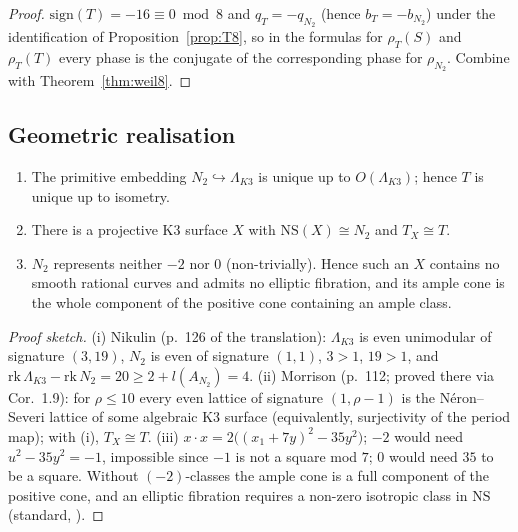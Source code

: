 \begin{proof}
$\mathrm{sign}(T)=-16\equiv0\bmod8$ and $q_T=-q_{N_2}$ (hence $b_T=-b_{N_2}$) under the identification of Proposition~\ref{prop:T8}, so in the formulas for $\rho_T(S)$ and $\rho_T(T)$ every phase is the conjugate of the corresponding phase for $\rho_{N_2}$. Combine with Theorem~\ref{thm:weil8}.
\end{proof}

\subsection{Geometric realisation}\label{sec:geom}
\begin{theorem}\label{thm:K3exist8}
\begin{enumerate}[label=(\roman*)]
\item The primitive embedding $N_2\hookrightarrow\Lambda_{K3}$ is unique up to $O(\Lambda_{K3})$; hence $T$ is unique up to isometry.
\item There is a projective K3 surface $X$ with $\mathrm{NS}(X)\cong N_2$ and $T_X\cong T$.
\item $N_2$ represents neither $-2$ nor $0$ (non-trivially). Hence such an $X$ contains no smooth rational curves and admits no elliptic fibration, and its ample cone is the whole component of the positive cone containing an ample class.
\end{enumerate}
\end{theorem}
\begin{proof}[Proof sketch]
(i) Nikulin \cite[Thm.~1.14.4]{Nikulin} (p.~126 of the translation): $\Lambda_{K3}$ is even unimodular of signature $(3,19)$, $N_2$ is even of signature $(1,1)$, $3>1$, $19>1$, and $\mathrm{rk}\,\Lambda_{K3}-\mathrm{rk}\,N_2=20\ge2+l(A_{N_2})=4$. (ii) Morrison \cite[Cor.~2.9(i)]{Morrison} (p.~112; proved there via Cor.~1.9): for $\rho\le10$ every even lattice of signature $(1,\rho-1)$ is the N\'eron--Severi lattice of some algebraic K3 surface (equivalently, surjectivity of the period map); with (i), $T_X\cong T$. (iii) $x\cdot x=2\big((x_1+7y)^2-35y^2\big)$; $-2$ would need $u^2-35y^2=-1$, impossible since $-1$ is not a square mod $7$; $0$ would need $35$ to be a square. Without $(-2)$-classes the ample cone is a full component of the positive cone, and an elliptic fibration requires a non-zero isotropic class in $\mathrm{NS}$ (standard, \cite{Huybrechts}).
\end{proof}

